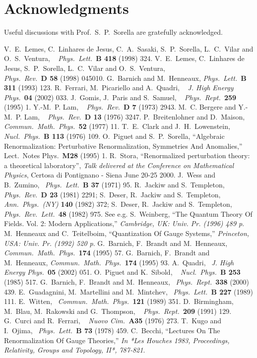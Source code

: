 \documentclass[a4paper,11pt]{article}
\providecommand\plb[3]{{\it Phys.\ Lett.\ }{\bf B #1} (#2) #3}
\providecommand\prd[3]{{\it Phys.\ Rev.\ }{\bf D #1} (#2) #3}
\providecommand\jhep[3]{{\it J. High Energy Phys.\ }{\bf #1} (#2) #3}
\providecommand\prep[3]{{\it Phys.\ Rept.\ }{\bf #1} (#2) #3}
\providecommand\cmp[3]{{\it Commun.\ Math.\ Phys.\ }{\bf #1} (#2) #3}
\providecommand\npb[3]{{\it Nucl.\ Phys.\ }{\bf B #1} (#2) #3}
\providecommand\ap[3]{{\it Ann.\ Phys.\ (NY) }{\bf #1} (#2) #3}
\providecommand\prl[3]{{\it Phys.\ Rev.\ Lett.\ }{\bf #1} (#2) #3}
\providecommand\nc[3]{{\it Nuovo Cim.\ }{\bf #1} (#2) #3}
\begin{document}
\section*{Acknowledgments}

Useful discussions with Prof.~S.~P.~Sorella are gratefully acknowledged.

\begin{thebibliography}{99}
%
V.~E.~Lemes, C.~Linhares de Jesus, C.~A.~Sasaki, S.~P.~Sorella, L.~C.~Vilar and O.~S.~Ventura, ~ \plb{418}{1998}{324}.
%
V.~E.~Lemes, C.~Linhares de Jesus, S.~P.~Sorella, L.~C.~Vilar and O.~S.~Ventura,\\ \prd{58}{1998}{045010}.
%
G.~Barnich and M.~Henneaux,
\plb{311}{1993}{123}.
%
R.~Ferrari, M.~Picariello and A.~Quadri, ~ \jhep{04}{2002}{033}.
%
J.~Gomis, J.~Paris and S.~Samuel, ~ \prep{259}{1995}{1}.
%
Y.-M.~P. Lam, ~ \prd{7}{1973}{2943}.
%
M.~C. Bergere and Y.-M.~P. Lam, ~ \prd{13}{1976}{3247}.
%
P.~Breitenlohner and D.~Maison, ~ \cmp{52}{1977}{11}.
%
T.~E.~Clark and J.~H.~Lowenstein, ~ \npb{113}{1976}{109}.
%
O.~Piguet and S.~P.~Sorella,
``Algebraic Renormalization: Perturbative Renormalization, Symmetries And Anomalies,''
Lect.\ Notes Phys.\  {\bf M28} (1995) 1.
%
{R.~Stora,
 ``Renormalized perturbation theory: a theoretical laboratory'',
 {\it Talk delivered at the Conference on Mathematical Physics},
 Certosa di Pontignano - Siena June 20-25 2000.}
%
J.~Wess and B.~Zumino,~ \plb{37}{1971}{95}.
%
R.~Jackiw and S.~Templeton, ~ \prd{23}{1981}{2291};
S.~Deser, R.~Jackiw and S.~Templeton,~ \ap{140}{1982}{372};
S.~Deser, R.~Jackiw and S.~Templeton, ~ \prl{48}{1982}{975}.
%
See e.g. S.~Weinberg,
``The Quantum Theory Of Fields. Vol. 2: Modern Applications,''
{\it  Cambridge, UK: Univ. Pr. (1996) 489 p}.
%
M.~Henneaux and C.~Teitelboim,
``Quantization Of Gauge Systems,''
{\it  Princeton, USA: Univ. Pr. (1992) 520 p}.
%
G.~Barnich, F.~Brandt and M.~Henneaux,
\cmp{174}{1995}{57}.
%
G.~Barnich, F.~Brandt and M.~Henneaux,
\cmp{174}{1995}{93}.
%
A.~Quadri,~ \jhep{05}{2002}{051}.
%
O.~Piguet and K.~Sibold, ~ \npb{253}{1985}{517}.
%
G.~Barnich, F.~Brandt and M.~Henneaux,~ \prep{338}{2000}{439}.
%
E.~Guadagnini, M.~Martellini and M.~Mintchev,~ \plb{227}{1989}{111}.
%
E.~Witten,~ \cmp{121}{1989}{351}.
%
D.~Birmingham, M.~Blau, M.~Rakowski and G.~Thompson,
~ \prep{209}{1991}{129}.
%
G.~Curci and R.~Ferrari,
~ \nc{A35}{1976}{273}.
%
T.~Kugo and I.~Ojima,~ \plb{73}{1978}{459}.
%
C.~Becchi,
``Lectures On The Renormalization Of Gauge Theories,''
{\it  In *Les Houches 1983, Proceedings, Relativity, Groups and Topology, II*, 787-821}.
%
%

\end{thebibliography}
\end{document}
